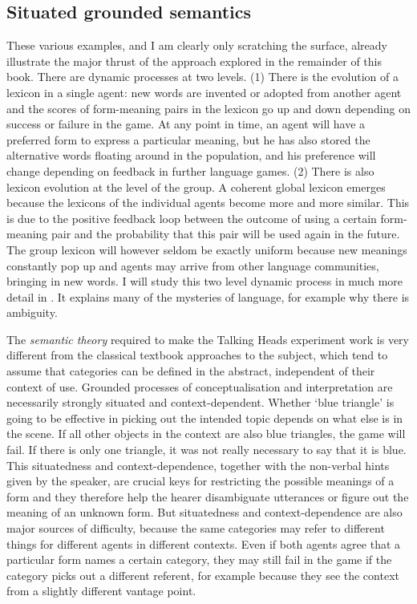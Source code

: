 \subsection{Situated grounded semantics}

These various examples, and I am clearly only 
scratching the surface, already illustrate the major thrust of the 
approach explored in the remainder of this book. 
There are dynamic processes at two levels. (1) There is 
the evolution of a lexicon in a single agent: new words are
invented or adopted from another agent and the
scores of form-meaning pairs in the lexicon
go up and down depending on success or
failure in the game. At any point in time, an agent 
will have a preferred form to express a particular meaning, 
but he has also stored the alternative words floating around in the 
population, and his preference will change depending on feedback
in further language games. (2) There is also lexicon evolution at 
the level of the group. A coherent global lexicon emerges because
the lexicons of the individual agents become more and more 
similar. This is due to the positive feedback loop between
the outcome of using
a certain form-meaning pair and the probability that
this pair will be used again in the future. 
The group lexicon will however seldom be exactly uniform because
new meanings constantly pop up and agents may arrive from 
other language communities, bringing in new words. 
I will study this two level dynamic process in much more detail 
in . It explains many of the mysteries of
language, for example why there is ambiguity. 

The {\it semantic theory} required to make the 
Talking Heads experiment work is very different from 
the classical textbook approaches to the subject, which
tend to assume that categories can be defined in the 
abstract, independent of their context of use. Grounded
processes of conceptualisation and interpretation are necessarily 
strongly situated and context-dependent. Whether `blue 
triangle' is going to be effective in picking out the 
intended topic depends on what else is in
the scene. If all other objects in the 
context are also blue triangles, the game will fail. If there
is only one triangle, it was not really necessary to say that 
it is blue. This situatedness and context-dependence, together with 
the non-verbal hints given by the speaker, are crucial 
keys for restricting the 
possible meanings of a form 
and they therefore help the hearer disambiguate 
utterances or figure out the meaning of an unknown form. But situatedness 
and con\-text-dependence are also major
sources of difficulty, because the same categories may
refer to different things for different agents in different
contexts. Even if both agents agree that a particular form 
names a certain category, 
they may still fail in the game if the category picks
out a different referent, for example because they see 
the context from a slightly different vantage point. 

